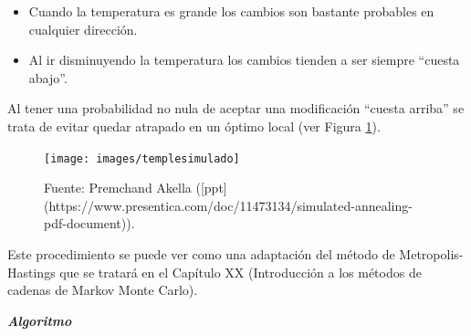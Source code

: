 \documentclass[
  10pt,
]{book}
\theoremstyle{break}
\theoremstyle{nonumberplain}
\begin{document}
\begin{itemize}
\item
  Cuando la temperatura es grande los cambios son bastante
  probables en cualquier dirección.
\item
  Al ir disminuyendo la temperatura los cambios tienden a ser
  siempre ``cuesta abajo''.
\end{itemize}

Al tener una probabilidad no nula de aceptar una modificación ``cuesta arriba'' se trata de evitar quedar atrapado en un óptimo local (ver Figura \ref{fig:templesimulado}).

\begin{figure}[!htbp]

{\centering \texttt{[image: images/templesimulado]} 

}

\caption{Fuente: Premchand Akella ([ppt](https://www.presentica.com/doc/11473134/simulated-annealing-pdf-document)).}\label{fig:templesimulado}
\end{figure}

Este procedimiento se puede ver como una adaptación del método de Metropolis-Hastings que se tratará en el Capítulo XX (Introducción a los métodos de cadenas de Markov Monte Carlo).

\textbf{\emph{Algoritmo}}
\end{document}
